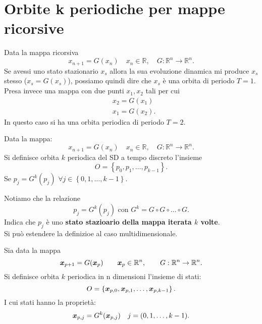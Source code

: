 \section{Orbite k periodiche per mappe ricorsive}%
Data la mappa ricorsiva
\[
    x_{n+1}=G(x_n) \quad  x_n \in \mathbb{R}, \quad  G:\mathbb{R}^n\to \mathbb{R}^n
.\] 
Se avessi uno stato stazionario $x_s$ allora la sua evoluzione dinamica mi produce $x_s$ stesso ($x_s = G(x_s)$), 
possiamo quindi dire che $x_s$ è una orbita di periodo $T=1$.\\
Presa invece una mappa con due punti $x_1, x_2$ tali per cui
\[\begin{aligned}
    &x_2 = G(x_1) \\
    &x_1= G(x_2) 
.\end{aligned}\]
In questo caso si ha una orbita periodica di periodo $T=2$. 
\begin{defn}
    Data la mappa:
    \[
	x_{n+1} = G(x_n) \quad  x_n \in \mathbb{R}, \quad  G:\mathbb{R}^n\to \mathbb{R}^n
    .\] 
    Si definisce orbita $k$ periodica del SD a tempo discreto l'insieme
    \[
        O = \left\{p_0, p_1, \ldots, p_{k-1}\right\}
    .\] 
    Se $p_j = G^k(p_j)$ $\forall j \in \left\{0, 1, \ldots, k-1\right\}$.
\end{defn}
\noindent
Notiamo che la relazione
\[
    p_j = G^k(p_j) \text{ con } G^k = G \circ G \circ \ldots \circ G
.\] 
Indica che $p_j$ è uno \textbf{stato stazioario della mappa iterata $k$ volte}.\\
Si può estendere la definizioe al caso multidimensionale.
\begin{defn}
Sia data la mappa
\[
    \boldsymbol{x}_{p+1} = G(\boldsymbol{x}_p) \qquad  \boldsymbol{x}_p \in \mathbb{R}^n, \qquad  G:\mathbb{R}^n\to \mathbb{R}^n
.\] 
Si definisce orbita $k$ periodica in n dimensioni l'insieme di stati:
\[
    O = \left\{\boldsymbol{x}_{p, 0}, \boldsymbol{x}_{p, 1}, \ldots,  \boldsymbol{x}_{p, k-1}\right\}
.\] 
I cui stati hanno la proprietà:
\[
    \boldsymbol{x}_{p, j} = G^k(\boldsymbol{x}_{p, j}) \quad  j = (0, 1, \ldots, k-1) 
.\] 
\end{defn}
\noindent
